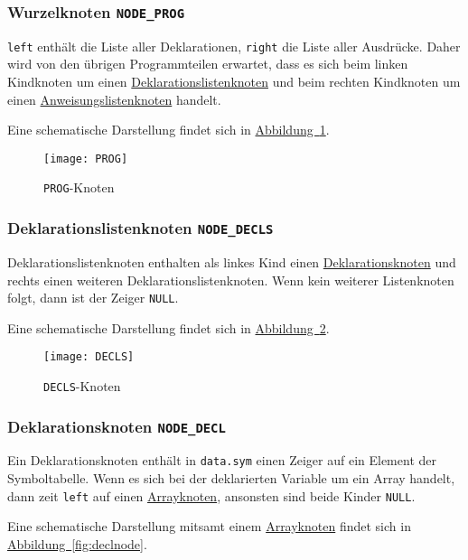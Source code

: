 \subsubsection{Wurzelknoten \texttt{NODE\_PROG}}
\label{sec:prognode}
\texttt{left} enthält die Liste aller Deklarationen,
\texttt{right} die Liste aller Ausdrücke.
Daher wird von den übrigen Programmteilen erwartet,
dass es sich beim linken Kindknoten um einen \hyperref[sec:declsnode]{Deklarationslistenknoten} und beim rechten Kindknoten um einen \hyperref[sec:stmtsnode]{Anweisungslistenknoten} handelt.

Eine schematische Darstellung findet sich in \hyperref[fig:prognode]{Abbildung~\ref{fig:prognode}}.

\begin{figure}[h!]
\centering
\texttt{[image: PROG]}
\caption{\texttt{PROG}-Knoten}
\label{fig:prognode}
\end{figure}

\subsubsection{Deklarationslistenknoten \texttt{NODE\_DECLS}}
\label{sec:declsnode}
Deklarationslistenknoten enthalten als linkes Kind einen \hyperref[sec:declnode]{Deklarationsknoten} und rechts einen weiteren Deklarationslistenknoten.
Wenn kein weiterer Listenknoten folgt,
dann ist der Zeiger \texttt{NULL}.

Eine schematische Darstellung findet sich in \hyperref[fig:declsnode]{Abbildung~\ref{fig:declsnode}}.

\begin{figure}[h!]
\centering
\texttt{[image: DECLS]}
\caption{\texttt{DECLS}-Knoten}
\label{fig:declsnode}
\end{figure}

\subsubsection{Deklarationsknoten \texttt{NODE\_DECL}}
\label{sec:declnode}
Ein Deklarationsknoten enthält in \texttt{data.sym} einen Zeiger auf ein Element der Symboltabelle.
Wenn es sich bei der deklarierten Variable um ein Array handelt,
dann zeit \texttt{left} auf einen \hyperref[sec:arraynode]{Arrayknoten},
ansonsten sind beide Kinder \texttt{NULL}.

Eine schematische Darstellung mitsamt einem \hyperref[sec:arraynode]{Arrayknoten} findet sich in \hyperref[fig:declnode]{Abbildung~\ref{fig:declnode}}.


